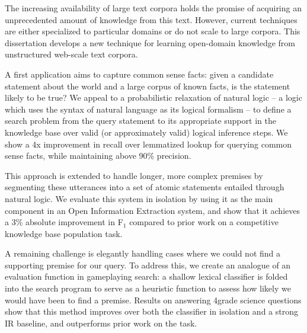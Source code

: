 
The increasing availability of large text corpora holds the promise of acquiring an 
  unprecedented amount of knowledge from this text.
However, current techniques are either specialized to particular domains or do not 
  scale to large corpora.
This dissertation develops a new technique for learning open-domain knowledge from 
  unstructured web-scale text corpora.

A first application aims to capture common sense facts: given a candidate statement 
  about the world and a large corpus of known facts, is the statement likely to be true? 
We appeal to a probabilistic relaxation of natural logic -- a logic which uses the syntax of 
  natural language as its logical formalism -- to define a search problem from the query 
  statement to its appropriate support in the knowledge base over valid (or approximately 
  valid) logical inference steps.
We show a 4x improvement in recall over lemmatized lookup for querying common sense facts,
  while maintaining above 90\% precision.

This approach is extended to handle longer, more complex premises by segmenting these 
  utterances into a set of atomic statements entailed through natural logic.
We evaluate this system in isolation by using it as the main component in an Open Information 
  Extraction system, and show that it achieves a 3\% absolute improvement in F$_1$ compared to 
  prior work on a competitive knowledge base population task.

A remaining challenge is elegantly handling cases where we could not find a supporting 
  premise for our query.
To address this, we create an analogue of an evaluation function in gameplaying search: 
  a shallow lexical classifier is folded into the search program to serve as a heuristic 
  function to assess how likely we would have been to find a premise.
Results on answering 4\nth grade science questions show that this method improves over 
  both the classifier in isolation and a strong IR baseline, and outperforms prior work
  on the task.


